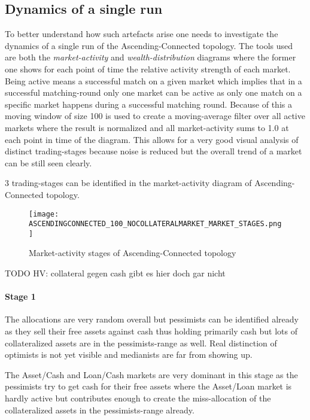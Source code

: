 \documentclass[Bachelorarbeit.tex]{subfiles}
\begin{document}
\subsection{Dynamics of a single run}
\label{sub:dynamics_singlerun}
To better understand how such artefacts arise one needs to investigate the dynamics of a single run of the Ascending-Connected topology. The tools used are both the \textit{market-activity} and \textit{wealth-distribution} diagrams where the former one shows for each point of time the relative activity strength of each market. Being active means a successful match on a given market which implies that in a successful matching-round only one market can be active as only one match on a specific market happens during a successful matching round. Because of this a moving window of size 100 is used to create a moving-average filter over all active markets where the result is normalized and all market-activity sums to 1.0 at each point in time of the diagram. This allows for a very good visual analysis of distinct trading-stages because noise is reduced but the overall trend of a market can be still seen clearly.

\medskip

3 trading-stages can be identified in the market-activity diagram of Ascending-Connected topology.

\begin{figure}[H]
	\centering
  \texttt{[image: ASCENDINGCONNECTED\_100\_NOCOLLATERALMARKET\_MARKET\_STAGES.png]}
  	\caption{Market-activity stages of Ascending-Connected topology}
	\label{fig:markets_ASCENDINGCONNECTED_100_NOCOLLATERALMARKET_MARKET_STAGES}
\end{figure}

TODO HV: collateral gegen cash gibt es hier doch gar nicht

\paragraph{Stage 1}
The allocations are very random overall but pessimists can be identified already as they sell their free assets against cash thus holding primarily cash but lots of collateralized assets are in the pessimists-range as well. Real distinction of optimists is not yet visible and medianists are far from showing up.

\medskip

The Asset/Cash and Loan/Cash markets are very dominant in this stage as the pessimists try to get cash for their free assets where the Asset/Loan market is hardly active but contributes enough to create the miss-allocation of the collateralized assets in the pessimists-range already.
\end{document}
